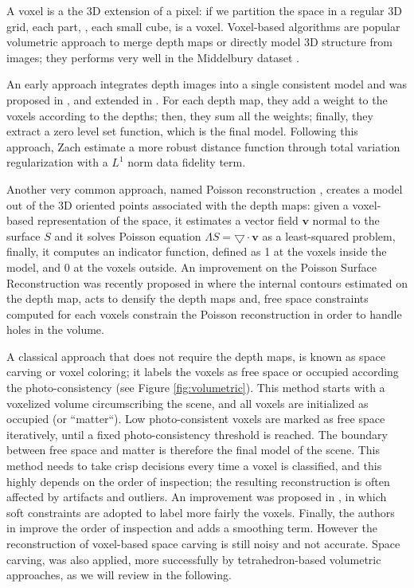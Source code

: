 A voxel is a the 3D extension of a pixel: if we partition the space in a regular 3D grid, each part, \ie, each small cube, is a voxel.
Voxel-based  algorithms are popular volumetric approach to merge depth maps or directly model 3D structure from images; they performs very well in the Middelbury dataset \cite{seitz_et_al06}.

An early approach integrates depth images into a single consistent model and was proposed in \cite{curless1996volumetric}, and extended in \cite{goesele2006multi}. For each depth map, they add a  weight to the voxels according to the depths; then, they sum all the weights; finally, they extract a zero level set function, which is the final model.
Following this approach, Zach \etal \cite{zach2007globally} estimate a more robust distance function through total variation regularization with a $L^1$ norm data fidelity term.

Another very common approach, named  Poisson reconstruction \cite{kazhdan2006poisson}, creates a model out of the 3D oriented points associated with the depth maps: given a voxel-based representation of the space,  it estimates a vector field $\mathbf{v}$ normal to the surface $\mathit{S}$ and it solves Poisson equation $\Lambda \mathit{S} = \bigtriangledown \cdot \mathbf{v}$ as a least-squared problem, finally, it computes an indicator function, defined as 1 at the voxels inside the model, and 0 at the voxels outside.
An improvement on the Poisson Surface Reconstruction was recently proposed in \cite{shan2014occluding} where the internal contours estimated on the depth map, acts to densify the depth maps and, free space constraints computed for each voxels constrain the Poisson reconstruction in order to handle holes in the volume.

A classical approach that does not require the depth maps, is known as space carving or voxel coloring; it labels the voxels as free space or occupied according the photo-consistency  \cite{seitz1999photorealistic,kutulakos_seitz05} (see Figure \ref{fig:volumetric}). 
This method starts with a voxelized volume circumscribing the scene, and all voxels are initialized as occupied (or ``matter``). 
Low photo-consistent voxels are marked as free space iteratively, until a fixed photo-consistency threshold is reached. The boundary between free space and matter is therefore the final model of the scene. 
This method needs to take crisp decisions every time a voxel is classified, and this highly depends on the order of inspection; the resulting reconstruction is often affected by artifacts and outliers.
An improvement was proposed in \cite{broadhurst2001probabilistic}, in which soft constraints are adopted to label more fairly the voxels.
Finally, the authors in \cite{yang2003multi} improve the order of inspection and adds a smoothing term. 
However the reconstruction of voxel-based space carving is still noisy and not  accurate.
Space carving, was also applied, more successfully by tetrahedron-based volumetric approaches, as we will  review in the following.

